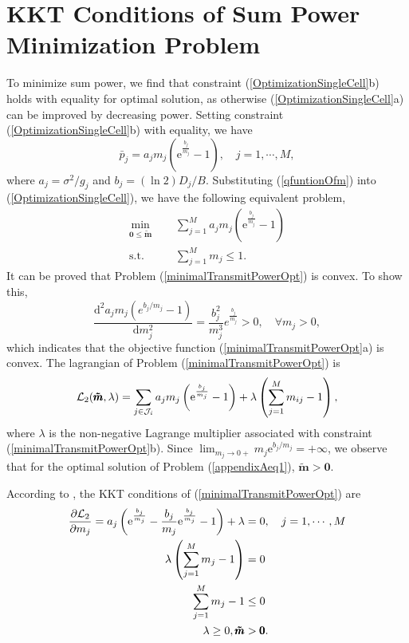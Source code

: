 \documentclass[journal]{IEEEtran}
\begin{document}
\section{KKT Conditions of Sum Power Minimization Problem}
To minimize sum power, we find that constraint (\ref{OptimizationSingleCell}b) holds with equality for optimal solution, as otherwise (\ref{OptimizationSingleCell}a) can be improved by decreasing power.
Setting constraint (\ref{OptimizationSingleCell}b) with equality, we have
\begin{equation}\label{qfuntionOfm}
\bar p_{j}
=a_j m_j \left(\textrm{e}^{\frac {b_{j}} {m_{j}}}-1\right),\quad j =1, \cdots, M,
\end{equation}
where $a_j=\sigma^2/g_j$ and $b_j=(\ln 2) D_j /B$.
Substituting (\ref{qfuntionOfm}) into (\ref{OptimizationSingleCell}), we have the following equivalent problem,
\begin{subequations}\label{minimalTransmitPowerOpt}
\begin{align}
\mathop{\min}_{\pmb 0 \leq \pmb{\tilde m}} \quad\!\!
&\sum_{j=1}^M a_j m_j \left(\textrm{e}^{\frac {b_{j}}  {m_{j}}}-1\right)\\
\textrm{s.t.}\qquad \!\!\!\!\!\!\!
&\sum_{j=1}^{M}m_j \leq 1.
\end{align}
\end{subequations}
It can be proved that Problem (\ref{minimalTransmitPowerOpt}) is convex.
To show this,
\begin{equation}\label{appendixAeq1}
\frac {\text{d}^2 a_{j} m_{j}
( e^{b_{j}/ m_{j} }-1
) }
{ \text{d} m_{j}^2  }= \frac{b_{j}^2} {m_{j} ^3}
e^{\frac{b_{j}} {m_{j}}} >0, \quad \forall m_{j} >0,
\end{equation}
which indicates that the objective function (\ref{minimalTransmitPowerOpt}a) is convex.
The lagrangian of Problem (\ref{minimalTransmitPowerOpt}) is
\begin{equation}
\mathcal L_2(\pmb{\tilde m}, \lambda)=
\sum_{j \in {\cal{J}}_i }
a_{j}  m_j \left(\textrm{e}^{\frac {b_{j}}  {m_{j}}}-1\right) + \lambda \left(\sum_{j =1}^M
m_{ij}-1\right),
\end{equation}
where $\lambda$ is the non-negative Lagrange multiplier associated with constraint (\ref{minimalTransmitPowerOpt}b).
Since $\lim_{m_j \rightarrow 0+}  m_j \textrm{e}^{ {b_{j}} / {m_{j}}}=+\infty$, we observe that for the optimal solution of Problem (\ref{appendixAeq1}), $\pmb {\tilde m}> \pmb 0$.

According to \cite{boyd2004convex}, the KKT conditions of (\ref{minimalTransmitPowerOpt}) are
\begin{subequations}\label{KKT1}
\begin{align}
\frac{\partial \mathcal L_2}{\partial m_j}=
a_{j} \left(\textrm{e}^{\frac{b_{j}} {m_{j}}}-\frac{b_{j}} {m_{j}} \textrm e^{\frac{b_{j}} {m_{j}}} -1\right) + \lambda
&=0, \quad j =1, \cdots, M\\
\lambda \left(\sum_{j =1}^Mm_{j}-1\right)
&=0\\
\sum_{j=1}^{M}m_j-1
&\leq 0
\\
\lambda
\geq 0, \pmb {\tilde m} &> \pmb 0.
\end{align}
\end{subequations}
\end{document}
